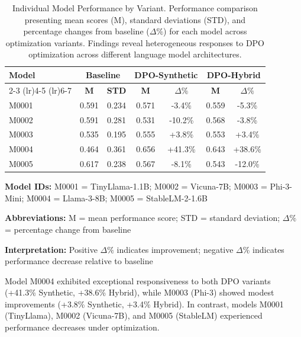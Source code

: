 \begin{table}[H]
\centering
\begin{tabular}{lcccccc}
\toprule
\multirow{2}{*}{\textbf{Model}} & \multicolumn{2}{c}{\textbf{Baseline}} & \multicolumn{2}{c}{\textbf{DPO-Synthetic}} & \multicolumn{2}{c}{\textbf{DPO-Hybrid}} \\
\cmidrule(lr){2-3} \cmidrule(lr){4-5} \cmidrule(lr){6-7}
& \textbf{M} & \textbf{STD} & \textbf{M} & \textbf{$\Delta\%$} & \textbf{M} & \textbf{$\Delta\%$} \\
\midrule
M0001 & 0.591 & 0.234 & 0.571 & -3.4\% & 0.559 & -5.3\% \\
M0002 & 0.591 & 0.281 & 0.531 & -10.2\% & 0.568 & -3.8\% \\
M0003 & 0.535 & 0.195 & 0.555 & +3.8\% & 0.553 & +3.4\% \\
M0004 & 0.464 & 0.361 & 0.656 & +41.3\% & 0.643 & +38.6\% \\
M0005 & 0.617 & 0.238 & 0.567 & -8.1\% & 0.543 & -12.0\% \\

\bottomrule
\end{tabular}
\caption[Individual Model Performance]{Individual Model Performance by Variant. Performance comparison presenting mean scores (M), standard deviations (STD), and percentage changes from baseline ($\Delta\%$) for each model across optimization variants. Findings reveal heterogeneous responses to DPO optimization across different language model architectures.}
\label{tab:model-specific}
\begin{tablenotes}
\small
\item \textbf{Model IDs:} M0001 = TinyLlama-1.1B; M0002 = Vicuna-7B; M0003 = Phi-3-Mini; M0004 = Llama-3-8B; M0005 = StableLM-2-1.6B
\item \textbf{Abbreviations:} M = mean performance score; STD = standard deviation; $\Delta\%$ = percentage change from baseline
\item \textbf{Interpretation:} Positive $\Delta\%$ indicates improvement; negative $\Delta\%$ indicates performance decrease relative to baseline
\end{tablenotes}
\end{table}

Model M0004 exhibited exceptional responsiveness to both DPO variants (+41.3\% Synthetic, +38.6\% Hybrid), while M0003 (Phi-3) showed modest improvements (+3.8\% Synthetic, +3.4\% Hybrid). In contrast, models M0001 (TinyLlama), M0002 (Vicuna-7B), and M0005 (StableLM) experienced performance decreases under optimization.

